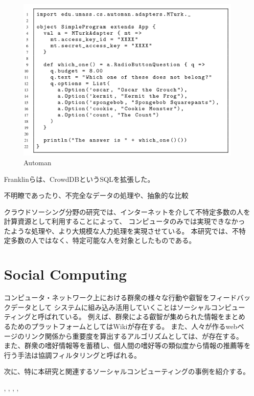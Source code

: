 \begin{figure}[htbp]
  \begin{center}
  \includegraphics[width=.6\linewidth,bb=0 0 552 404]{images/automan.png}
  \end{center}
  \caption{Automan}
  \label{fig:automan}
\end{figure}

Franklinらは、CrowdDBというSQLを拡張した。

不明瞭であったり、不完全なデータの処理や、抽象的な比較 \cite{crowddb}

\cite{cylog} \cite{crowdforge} \cite{community-based-crowdsourcing}
\cite{realtime-captioning}

クラウドソーシング分野の研究では、インターネットを介して不特定多数の人を計算資源として利用することによって、
コンピュータのみでは実現できなかったような処理や、より大規模な人力処理を実現させている。
本研究では、不特定多数の人ではなく、特定可能な人を対象としたものである。

\section{Social Computing}\label{social-computing}

コンピュータ・ネットワーク上における群衆の様々な行動や叡智をフィードバックデータとして
システムに組み込み活用していくことはソーシャルコンピューティングと呼ばれている。
例えば、群衆による叡智が集められた情報をまとめるためのプラットフォームとしてはWiki\cite{wiki}が存在する。
また、人々が作るwebページのリンク関係から重要度を算出するアルゴリズムとしては、\cite{pagerank}が存在する。
また、群衆の嗜好情報等を蓄積し、個人間の嗜好等の類似度から情報の推薦等を行う手法は協調フィルタリングと呼ばれる\cite{collaborative-filtering}。

次に、特に本研究と関連するソーシャルコンピューティングの事例を紹介する。

\cite{dog}, \cite{jabberwocky}, \cite{social-machines},
\cite{personal-api},

